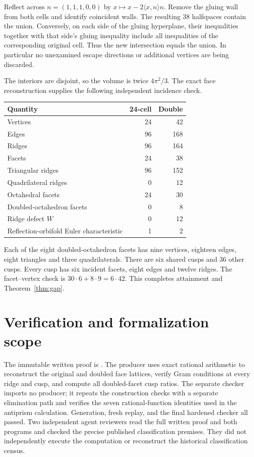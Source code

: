 \documentclass[11pt]{article}
\newcommand{\ip}[2]{\langle #1,#2\rangle}
\begin{document}
Reflect across $n=(1,1,1,0,0)$ by
$x\mapsto x-2\ip{x}{n}n$. Remove the gluing wall from both cells
and identify coincident walls. The resulting 38 halfspaces contain
the union. Conversely, on each side of the gluing hyperplane, their
inequalities together with that side's gluing inequality include all
inequalities of the corresponding original cell. Thus the new
intersection equals the union. In particular no unexamined escape
directions or additional vertices are being discarded.

The interiors are disjoint, so the volume is twice $4\pi^2/3$.
The exact face reconstruction supplies the following independent
incidence check.
\begin{center}
\begin{tabular}{lrr}
\toprule Quantity&24-cell&Double\\\midrule
Vertices&24&42\\ Edges&96&168\\ Ridges&96&164\\ Facets&24&38\\
Triangular ridges&96&152\\ Quadrilateral ridges&0&12\\
Octahedral facets&24&30\\ Doubled-octahedron facets&0&8\\
Ridge defect $W$&0&12\\ Reflection-orbifold Euler characteristic&1&2\\
\bottomrule
\end{tabular}
\end{center}
Each of the eight doubled-octahedron facets has nine vertices, eighteen
edges, eight triangles and three quadrilaterals. There are six shared
cusps and 36 other cusps. Every cusp has six incident facets, eight
edges and twelve ridges. The facet--vertex check is
$30\cdot6+8\cdot9=6\cdot42$. This completes attainment and
Theorem~\ref{thm:gap}.

\section{Verification and formalization scope}
The immutable written proof is
.
The producer
uses exact rational arithmetic to reconstruct the original and doubled
face lattices, verify Gram conditions at every ridge and cusp, and
compute all doubled-facet cusp ratios. The separate checker
imports no producer; it repeats the construction checks with a separate
elimination path and verifies the seven rational-function identities
used in the antiprism calculation. Generation, fresh replay, and the
final hardened checker all passed. Two independent agent reviewers
read the full written proof and both programs and checked the precise
published classification premises. They did not independently execute
the computation or reconstruct the historical classification census.
\end{document}
